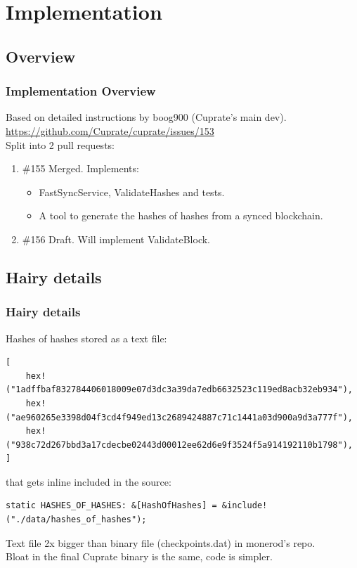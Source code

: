 \documentclass[aspectratio=169]{beamer}
\begin{document}
\section{Implementation}
\subsection{Overview}
\begin{frame}[fragile]
  \frametitle{Implementation Overview}
  Based on detailed instructions by boog900 (Cuprate's main dev).\\
  \url{https://github.com/Cuprate/cuprate/issues/153}\\
  \vspace{2\baselineskip}
  Split into 2 pull requests:
  \vspace{1\baselineskip}
  \begin{enumerate}
    \item \#155 Merged. Implements:
    \begin{itemize}
      \item FastSyncService, ValidateHashes and tests.
      \item A tool to generate the hashes of hashes from a synced blockchain.
    \end{itemize}
  \vspace{1\baselineskip}
  \item \#156 Draft. Will implement ValidateBlock.
  \end{enumerate}
\end{frame}

\subsection{Hairy details}
\begin{frame}[fragile]
  \frametitle{Hairy details}
  Hashes of hashes stored as a text file:
  \lstset{
    basicstyle=\tiny\ttfamily,
  }
  \begin{lstlisting}
[
	hex!("1adffbaf832784406018009e07d3dc3a39da7edb6632523c119ed8acb32eb934"),
	hex!("ae960265e3398d04f3cd4f949ed13c2689424887c71c1441a03d900a9d3a777f"),
	hex!("938c72d267bbd3a17cdecbe02443d00012ee62d6e9f3524f5a914192110b1798"),
]
  \end{lstlisting}
  that gets inline included in the source:
  \begin{lstlisting}
static HASHES_OF_HASHES: &[HashOfHashes] = &include!("./data/hashes_of_hashes");
  \end{lstlisting}
  Text file 2x bigger than binary file (checkpoints.dat) in monerod's repo.\\
  Bloat in the final Cuprate binary is the same, code is simpler.
\end{frame}
\end{document}
